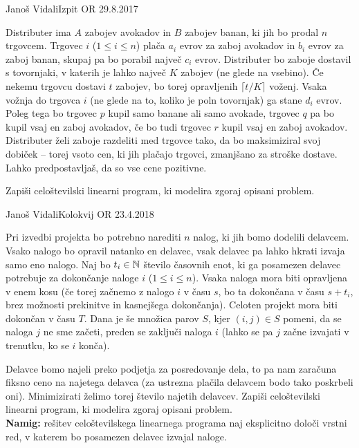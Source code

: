 \begin{naloga}{Janoš Vidali}{Izpit OR 29.8.2017}
\begin{vprasanje}
Distributer ima $A$ zabojev avokadov in $B$ zabojev banan,
ki jih bo prodal $n$ trgovcem.
Trgovec $i$ ($1 \le i \le n$)
plača $a_i$ evrov za zaboj avokadov in $b_i$ evrov za zaboj banan,
skupaj pa bo porabil največ $c_i$ evrov.
Distributer bo zaboje dostavil s tovornjaki,
v katerih je lahko največ $K$ zabojev (ne glede na vsebino).
Če nekemu trgovcu dostavi $t$ zabojev,
bo torej opravljenih $\lceil t/K \rceil$ voženj.
Vsaka vožnja do trgovca $i$ (ne glede na to, koliko je poln tovornjak)
ga stane $d_i$ evrov.
Poleg tega bo trgovec $p$ kupil samo banane ali samo avokade,
trgovec $q$ pa bo kupil vsaj en zaboj avokadov,
če bo tudi trgovec $r$ kupil vsaj en zaboj avokadov.
Distributer želi zaboje razdeliti med trgovce tako,
da bo maksimiziral svoj dobiček
-- torej vsoto cen, ki jih plačajo trgovci,
zmanjšano za stroške dostave.
Lahko predpostavljaš, da so vse cene pozitivne.

Zapiši celoštevilski linearni program, ki modelira zgoraj opisani problem.
\end{vprasanje}
\begin{odgovor}
\end{odgovor}
\end{naloga}


\begin{naloga}{Janoš Vidali}{Kolokvij OR 23.4.2018}
\begin{vprasanje}
Pri izvedbi projekta bo potrebno narediti $n$ nalog,
ki jih bomo dodelili delavcem.
Vsako nalogo bo opravil natanko en delavec,
vsak delavec pa lahko hkrati izvaja samo eno nalogo.
Naj bo $t_i \in \mathbb{N}$ število časovnih enot,
ki ga posamezen delavec potrebuje za dokončanje naloge $i$
($1 \le i \le n$).
Vsaka naloga mora biti opravljena v enem kosu
(če torej začnemo z nalogo $i$ v času $s$,
bo ta dokončana v času $s+t_i$,
brez možnosti prekinitve in kasnejšega dokončanja).
Celoten projekt mora biti dokončan v času $T$.
Dana je še množica parov $S$,
kjer $(i, j) \in S$ pomeni,
da se naloga $j$ ne sme začeti, preden se zaključi naloga $i$
(lahko se pa $j$ začne izvajati v trenutku, ko se $i$ konča).

Delavce bomo najeli preko podjetja za posredovanje dela,
to pa nam zaračuna fiksno ceno na najetega delavca
(za ustrezna plačila delavcem bodo tako poskrbeli oni).
Minimizirati želimo torej število najetih delavcev.
Zapiši celoštevilski linearni program, ki modelira zgoraj opisani problem. \\
{\small {\bf Namig:}
rešitev celoštevilskega linearnega programa naj eksplicitno določi vrstni red,
v katerem bo posamezen delavec izvajal naloge.}
\end{vprasanje}
\begin{odgovor}
\end{odgovor}
\end{naloga}


